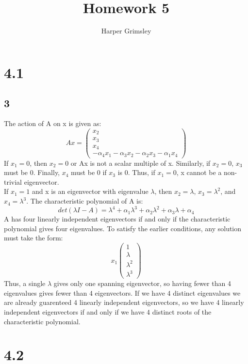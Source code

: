 \documentclass{article}
\title{Homework 5}
\author{Harper Grimsley}
\begin{document}
\maketitle
\section*{4.1}
\subsection*{3}
The action of A on x is given as:
$$Ax = \begin{pmatrix}x_2\\x_3\\x_4\\-\alpha_4x_1-\alpha_3x_2-\alpha_2x_3-\alpha_1x_4\end{pmatrix}$$
If $x_1 = 0$, then $x_2 = 0$ or Ax is not a scalar multiple of x.  Similarly, if $x_2 = 0$, $x_3$ must be 0. Finally, $x_4$ must be 0 if $x_3$ is 0.  Thus, if $x_1 = 0$, x cannot be a non-trivial eigenvector.   
\\
If $x_1 =1$ and x is an eigenvector with eigenvalue $\lambda$, then $x_2 = \lambda$, $x_3 = \lambda^2$, and $x_4 = \lambda^3$. The characteristic polynomial of A is:  
$$det(\lambda I-A) = \lambda^4 + \alpha_1\lambda^3+\alpha_2\lambda^2+\alpha_3\lambda+\alpha_4$$
A has four linearly independent eigenvectors if and only if the characteristic polynomial gives four eigenvalues.  To satisfy the earlier conditions, any solution must take the form:
$$x_1 \begin{pmatrix}1\\\lambda\\\lambda^2\\\lambda^3\end{pmatrix}$$ 
Thus, a single $\lambda$ gives only one spanning eigenvector, so having fewer than 4 eigenvalues gives fewer than 4 eigenvectors.  If we have 4 distinct eigenvalues we are already guarenteed 4 linearly independent eigenvectors, so we have 4 linearly independent eigenvectors if and only if we have 4 distinct roots of the characteristic polynomial.
\section*{4.2}
\end{document}
